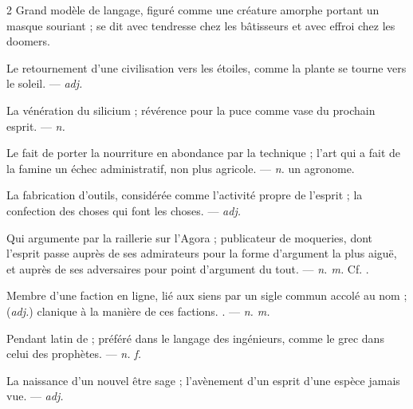 \begin{multicols}{2}
  Grand modèle de langage, figuré comme une créature amorphe portant un masque souriant ; se dit avec tendresse chez les bâtisseurs et avec effroi chez les doomers.

 Le retournement d'une civilisation vers les étoiles, comme la plante se tourne vers le soleil. —  \textit{adj.}

 La vénération du silicium ; révérence pour la puce comme vase du prochain esprit. —  \textit{n.}

 Le fait de porter la nourriture en abondance par la technique ; l'art qui a fait de la famine un échec administratif, non plus agricole. —  \textit{n.} un agronome.

 La fabrication d'outils, considérée comme l'activité propre de l'esprit ; la confection des choses qui font les choses. —  \textit{adj.}

 Qui argumente par la raillerie sur l'Agora ; publicateur de moqueries, dont l'esprit passe auprès de ses admirateurs pour la forme d'argument la plus aiguë, et auprès de ses adversaires pour point d'argument du tout.   —  \textit{n. m.} Cf. .

 Membre d'une faction en ligne, lié aux siens par un sigle commun accolé au nom ; (\textit{adj.}) clanique à la manière de ces factions. . —  \textit{n. m.}

 Pendant latin de  ; préféré dans le langage des ingénieurs, comme le grec dans celui des prophètes. —  \textit{n. f.}

 La naissance d'un nouvel être sage ; l'avènement d'un esprit d'une espèce jamais vue. —  \textit{adj.}


\end{multicols}
